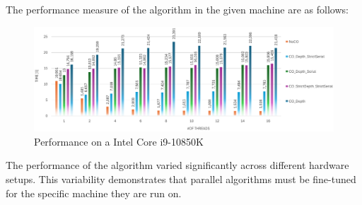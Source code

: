 \documentclass[paper=a4, fontsize=12pt]{scrartcl}
\numberwithin{equation}{section}
\numberwithin{figure}{section}
\numberwithin{table}{section}
\begin{document}
    The performance measure of the algorithm in the given machine are as follows: 
    \begin{figure}[!ht]
        \centering
        \includegraphics[width=1\linewidth]{image.png}
        \caption{Performance on a Intel Core i9-10850K}
    \end{figure}
    
    The performance of the algorithm varied significantly across different hardware setups.
    This variability demonstrates that parallel algorithms must be fine-tuned for the specific machine they are run on.
\end{document}

